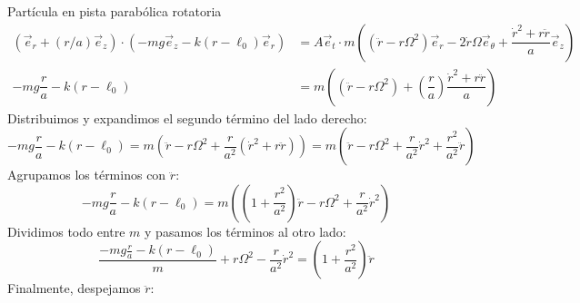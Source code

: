 \begin{solucion}{Partícula en pista parabólica rotatoria}
\begin{align*}
(\vec{e}_r+(r/a)\vec{e}_z)\cdot(-mg\vec{e}_z-k(r-\ell_0)\vec{e}_r)&=A\vec{e}_t\cdot m\left((\ddot{r}-r\Omega^2)\vec{e}_r-2\dot r\Omega\vec{e}_{\theta}+\dfrac{\dot r^2+r\ddot r}{a}\vec{e}_z\right)\\
-mg\dfrac{r}{a}-k(r-\ell_0)&= m\left((\ddot{r}-r\Omega^2)+\left(\dfrac{r}{a}\right)\dfrac{\dot r^2+r\ddot r}{a}\right)
\end{align*}
Distribuimos y expandimos el segundo término del lado derecho:
$$- mg \frac{r}{a} - k(r - \ell_0) = m\left( \ddot{r} - r\Omega^2 + \frac{r}{a^2}(\dot{r}^2 + r\ddot{r}) \right)= m\left( \ddot{r} - r\Omega^2 + \frac{r}{a^2} \dot{r}^2 + \frac{r^2}{a^2} \ddot{r} \right)$$
Agrupamos los términos con $\ddot{r}$:
$$- mg \frac{r}{a} - k(r - \ell_0) = m\left( \left(1 + \frac{r^2}{a^2} \right)\ddot{r} - r\Omega^2 + \frac{r}{a^2} \dot{r}^2 \right)$$
Dividimos todo entre $m$ y pasamos los términos al otro lado:
$$\frac{- mg \frac{r}{a} - k(r - \ell_0)}{m} + r\Omega^2 - \frac{r}{a^2} \dot{r}^2 = \left(1 + \frac{r^2}{a^2} \right)\ddot{r}$$
Finalmente, despejamos $\ddot{r}$:

\end{solucion}
